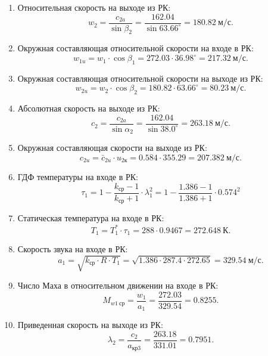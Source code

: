 \documentclass[a4paper,10pt]{article}
\begin{document}
\begin{enumerate}
        \item Относительная скорость на выходе из РК:
        \[
            w_2 = \frac{ c_{2a} }{ \sin{\beta_2} } = 
            \frac{ 162.04 }{ \sin{ 63.66^\circ } } = 
            180.82\ м/с.
        \]

        \item Окружная составляющая относительной скорости на входе в РК:
        \[
            w_{1u} = w_1 \cdot \cos{ \beta_1 } = 
            272.03 \cdot 36.98^\circ = 
            217.32 \ м/с.
        \]

        \item Окружная составляющая относительной скорости на выходе из РК:
        \[
            w_{2u} = w_2 \cdot \cos{ \beta_2 } = 
            180.82 \cdot 63.66^\circ = 
            80.23 \ м/с.
        \]

        \item Абсолютная скорость на выходе из РК:
        \[
            c_2 = \frac{ c_{2a} }{ \sin{\alpha_2} } = 
            \frac{ 162.04 }{ \sin{ 38.0^\circ } } = 
            263.18\ м/с.
        \]

        \item Окружная составляющая скорости на выходе из РК:
        \[
            c_{2u} = \bar{c}_{2u} \cdot u_{2к} = 
            0.584 \cdot 355.29 = 
            207.382\ м/с.
        \]

        \item ГДФ температуры на входе в РК:
        \[
            \tau_1 = 1 - \frac{ k_{ср} - 1 }{ k_{ср} + 1 } \cdot \lambda_1^2 =  
            1 - \frac{ 1.386 - 1 }{ 1.386 + 1 } \cdot 0.574^2
        \]

        \item Статическая температура на входе в РК:
        \[
            T_1 = T_1^* \cdot \tau_1 = 288 \cdot 0.9467 = 
            272.648\ К.
        \]

        \item Скорость звука на входе в РК:
        \[
            a_1 = \sqrt{ k_{ср} \cdot R \cdot T_1 } = 
            \sqrt{ 1.386 \cdot 287.4 \cdot 272.65 } =
            329.54\ м/с.
        \]

        \item Число Маха в относительном движении на входе в РК:
        \[
            M_{w1\ ср} = \frac{ w_1 }{ a_1 } = \frac{ 272.03 }{ 329.54 } = 
            0.8255.
        \]

        \item Приведенная скорость на выходе из РК:
        \[
            \lambda_2 = \frac{ c_2 }{ a_{кр3} } =
            \frac{ 263.18 }{ 331.01 } = 
            0.7951.
        \]


\end{enumerate}
\end{document}
